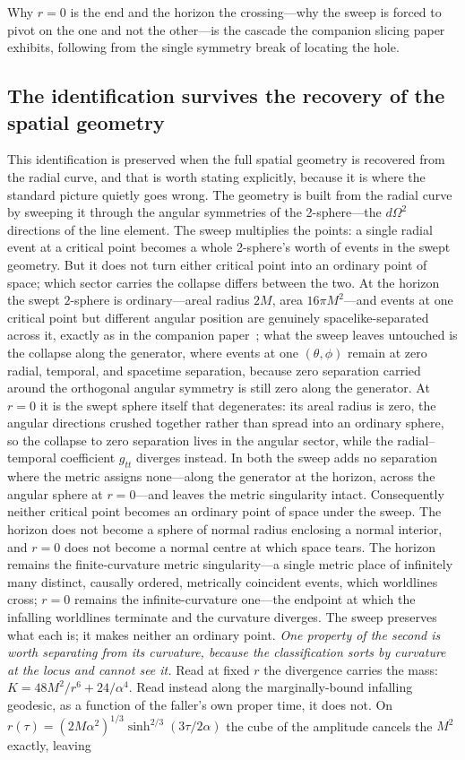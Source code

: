 \documentclass[11pt,a4paper]{article}
\theoremstyle{definition}
\begin{document}
Why $r=0$ is the end and the horizon the crossing---why the sweep is forced to pivot on the one and not the other---is the cascade the companion slicing paper~\cite{JanzenSlicing} exhibits, following from the single symmetry break of locating the hole.

\subsection{The identification survives the recovery of the spatial geometry}

This identification is preserved when the full spatial geometry is recovered from the radial curve, and that is worth stating explicitly, because it is where the standard picture quietly goes wrong. The geometry is built from the radial curve by sweeping it through the angular symmetries of the 2-sphere---the $d\Omega^2$ directions of the line element. The sweep multiplies the points: a single radial event at a critical point becomes a whole 2-sphere's worth of events in the swept geometry. But it does not turn either critical point into an ordinary point of space; which sector carries the collapse differs between the two. At the horizon the swept $2$-sphere is ordinary---areal radius $2M$, area $16\pi M^2$---and events at one critical point but different angular position are genuinely spacelike-separated across it, exactly as in the companion paper~\cite{JanzenBHcausality}; what the sweep leaves untouched is the collapse along the generator, where events at one $(\theta,\phi)$ remain at zero radial, temporal, and spacetime separation, because zero separation carried around the orthogonal angular symmetry is still zero along the generator. At $r=0$ it is the swept sphere itself that degenerates: its areal radius is zero, the angular directions crushed together rather than spread into an ordinary sphere, so the collapse to zero separation lives in the angular sector, while the radial--temporal coefficient $g_{tt}$ diverges instead. In both the sweep adds no separation where the metric assigns none---along the generator at the horizon, across the angular sphere at $r=0$---and leaves the metric singularity intact. Consequently neither critical point becomes an ordinary point of space under the sweep. The horizon does not become a sphere of normal radius enclosing a normal interior, and $r=0$ does not become a normal centre at which space tears. The horizon remains the finite-curvature metric singularity---a single metric place of infinitely many distinct, causally ordered, metrically coincident events, which worldlines cross; $r=0$ remains the infinite-curvature one---the endpoint at which the infalling worldlines terminate and the curvature diverges. The sweep preserves what each is; it makes neither an ordinary point. \emph{One property of the second is worth separating from its curvature, because the classification sorts by curvature at the locus and cannot see it.} Read at fixed $r$ the divergence carries the mass: $K=48M^{2}/r^{6}+24/\alpha^{4}$. Read instead along the marginally-bound infalling geodesic, as a function of the faller's own proper time, it does not. On $r(\tau)=(2M\alpha^{2})^{1/3}\sinh^{2/3}(3\tau/2\alpha)$ the cube of the amplitude cancels the $M^{2}$ exactly, leaving 
\end{document}
